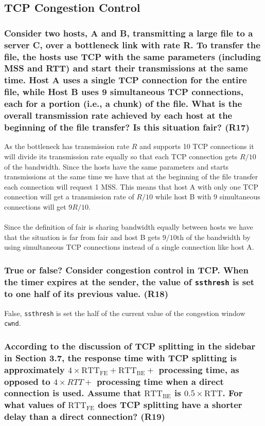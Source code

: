 \subsection{TCP Congestion Control}


\subsubsection{Consider two hosts, A and B, transmitting a large file to a server C, over a bottleneck link with rate R. To transfer the file, the hosts use TCP with the same parameters (including MSS and RTT) and start their transmissions at the same time. Host A uses a single TCP connection for the entire file, while Host B uses 9 simultaneous TCP connections, each for a portion (i.e., a chunk) of the file. What is the overall transmission rate achieved by each host at the beginning of the file transfer? Is this situation fair? (R17)}

As the bottleneck has transmission rate $R$ and supports 10 TCP connections it will divide its transmission rate equally so that each TCP connection gets $R/10$ of the bandwidth. Since the hosts have the same parameters and starts transmissions at the same time we have that at the beginning of the file transfer each connection will request 1 MSS. This means that host A with only one TCP connection will get a transmission rate of $R/10$ while host B with 9 simultaneous connections will get $9R/10$. \\
\\
Since the definition of fair is sharing bandwidth equally between hosts we have that the situation is far from fair and host B gets $9/10$th of the bandwidth by using simultaneous TCP connections instead of a single connection like host A.

\subsubsection{True or false? Consider congestion control in TCP. When the timer expires at the sender, the value of \texttt{ssthresh} is set to one half of its previous value. (R18)}

False, \texttt{ssthresh} is set the half of the current value of the congestion window \texttt{cwnd}.

\subsubsection{According to the discussion of TCP splitting in the sidebar in Section 3.7, the response time with TCP splitting is approximately $4 \times \text{RTT}_{\text{FE}} + \text{RTT}_{\text{BE}}+$ processing time, as opposed to $4 \times RTT +$ processing time when a direct connection is used. Assume that $\text{RTT}_\text{BE}$ is $0.5 \times \text{RTT}$. For what values of $\text{RTT}_{\text{FE}}$ does TCP splitting have a shorter delay than a direct connection? (R19)}

